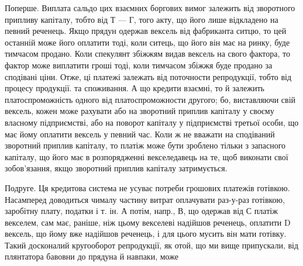 Поперше. Виплата сальдо цих взаємних боргових вимог залежить від
зворотного припливу капіталу, тобто від Т — Г, того акту, що його лише відкладено
на певний реченець. Якщо прядун одержав вексель від фабриканта ситцю,
то цей останній може його оплатити тоді, коли ситець, що його він має на
ринку, буде тимчасом продано. Коли спекулянт збіжжям видав вексель на свого
фактора, то фактор може виплатити гроші тоді, коли тимчасом збіжжя буде продано
за сподівані ціни. Отже, ці платежі залежать від поточности репродукції,
тобто від процесу продукції. та споживання. А що кредити взаємні, то й залежить
платоспроможність одного від платоспроможности другого; бо, виставляючи
свій вексель, кожен може рахувати або на зворотний приплив капіталу у своєму
власному підприємстві, або на поворот капіталу у підприємстві третьої особи,
що має йому оплатити вексель у певний час. Коли ж не вважати на сподіваний
зворотний приплив капіталу, то платіж може бути зроблено тільки з запасного
капіталу, що його має в розпорядженні векселедавець на те, щоб виконати свої
зобов’язання, якщо зворотний приплив капіталу затримується.

Подруге. Ця кредитова система не усуває потреби грошових платежів
готівкою. Насамперед доводиться чималу частину витрат оплачувати раз-у-раз
готівкою, заробітну плату, податки і т. ін. А потім, напр., В, що одержав від
С платіж векселем, сам має, раніше, ніж цьому векселеві надійшов реченець,
оплатити D вексель, що йому вже надійшов реченець, і для цього мусить
він мати готівку. Такий досконалий кругооборот репродукції, як отой, що ми
вище припускали, від плянтатора бавовни до прядуна й навпаки, може
